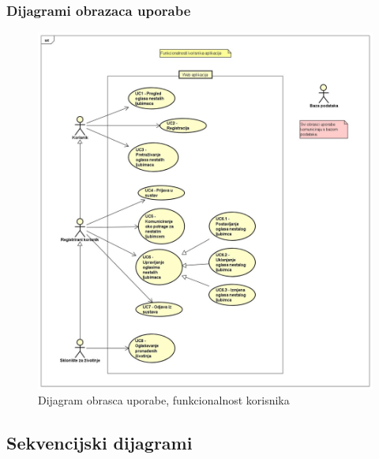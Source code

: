 				
					
				\pagebreak
				\subsubsection{Dijagrami obrazaca uporabe}
				
					\begin{figure}[htb]
						\centering
						\includegraphics[width=\textwidth]{slike/funkcionalnost_korisnika.jpg}
						\caption{Dijagram obrasca uporabe, funkcionalnost korisnika}
					\end{figure}		
				
			\pagebreak
			\subsection{Sekvencijski dijagrami}

